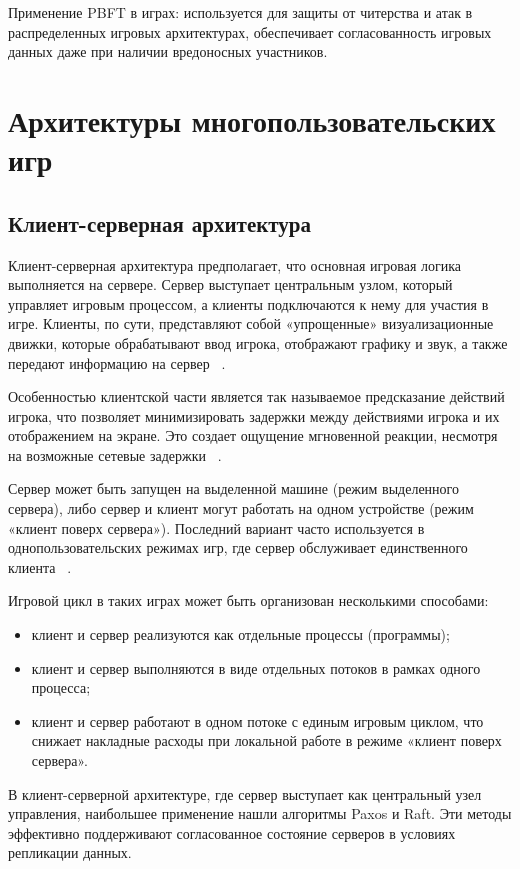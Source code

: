 Применение PBFT в играх: используется для защиты от читерства и атак в распределенных игровых архитектурах, обеспечивает согласованность игровых данных даже при наличии вредоносных участников.

\chapter{Архитектуры многопользовательских игр}

\section{Клиент-серверная архитектура}
Клиент-серверная архитектура предполагает, что основная игровая логика выполняется на сервере. Сервер выступает центральным узлом, который управляет игровым процессом, а клиенты подключаются к нему для участия в игре. Клиенты, по сути, представляют собой «упрощенные» визуализационные движки, которые обрабатывают ввод игрока, отображают графику и звук, а также передают информацию на сервер ~\cite{b4}.

Особенностью клиентской части является так называемое предсказание действий игрока, что позволяет минимизировать задержки между действиями игрока и их отображением на экране. Это создает ощущение мгновенной реакции, несмотря на возможные сетевые задержки ~\cite{b4}.

Сервер может быть запущен на выделенной машине (режим выделенного сервера), либо сервер и клиент могут работать на одном устройстве (режим «клиент поверх сервера»). Последний вариант часто используется в однопользовательских режимах игр, где сервер обслуживает единственного клиента ~\cite{b4}.

Игровой цикл в таких играх может быть организован несколькими способами:
\begin{itemize}
	\item клиент и сервер реализуются как отдельные процессы (программы);
	\item клиент и сервер выполняются в виде отдельных потоков в рамках одного процесса;
	\item клиент и сервер работают в одном потоке с единым игровым циклом, что снижает накладные расходы при локальной работе в режиме «клиент поверх сервера».
\end{itemize}

В клиент-серверной архитектуре, где сервер выступает как центральный узел управления, наибольшее применение нашли алгоритмы Paxos и Raft. Эти методы эффективно поддерживают согласованное состояние серверов в условиях репликации данных. 

